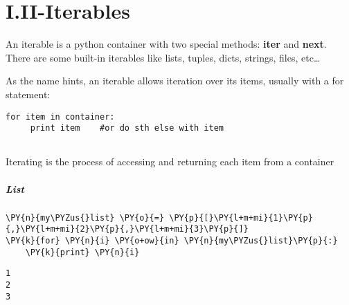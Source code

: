 






    
    \section{I.II-Iterables}\label{i.ii-iterables}

    An iterable is a python container with two special methods:
\textbf{iter} and \textbf{next}. There are some built-in iterables like
lists, tuples, dicts, strings, files, etc\ldots{}

As the name hints, an iterable allows iteration over its items, usually
with a for statement:

\begin{verbatim}
for item in container:
     print item    #or do sth else with item
     
\end{verbatim}

Iterating is the process of accessing and returning each item from a
container


    \subparagraph{\textbf{List}}



{\par%
\vspace{-1\baselineskip}%
}%
\begin{notebookcell}[4]%
\begin{addmargin}[\cellleftmargin]{0em}%
{\smaller%
\par%
%
\vspace{-1\smallerfontscale}%
\begin{Verbatim}[commandchars=\\\{\}]
\PY{n}{my\PYZus{}list} \PY{o}{=} \PY{p}{[}\PY{l+m+mi}{1}\PY{p}{,}\PY{l+m+mi}{2}\PY{p}{,}\PY{l+m+mi}{3}\PY{p}{]}
\PY{k}{for} \PY{n}{i} \PY{o+ow}{in} \PY{n}{my\PYZus{}list}\PY{p}{:}
    \PY{k}{print} \PY{n}{i}
\end{Verbatim}
%
\par%
\vspace{-1\smallerfontscale}}%
\end{addmargin}
\end{notebookcell}

\par\vspace{1\smallerfontscale}%
    \begin{addmargin}[\cellleftmargin]{0em}%
    {\smaller%
    \vspace{-1\smallerfontscale}%
    
    \begin{Verbatim}[commandchars=\\\{\}]
1
2
3
    \end{Verbatim}
}%
    \end{addmargin}%

